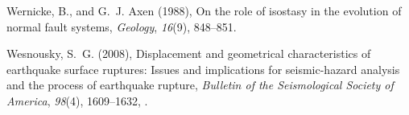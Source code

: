 \documentclass[draft,grl]{AGUTeX}
\begin{document}
\begin{article}
\begin{thebibliography}{29}
Wernicke, B., and G.~J. Axen (1988), On the role of isostasy in the evolution
  of normal fault systems, \textit{Geology}, \textit{16}(9), 848--851.

Wesnousky, S.~G. (2008), Displacement and geometrical characteristics of
  earthquake surface ruptures: Issues and implications for seismic-hazard
  analysis and the process of earthquake rupture, \textit{Bulletin of the
  Seismological Society of America}, \textit{98}(4), 1609--1632,
  .

\end{thebibliography}



\end{article}


%
%
\end{document}
